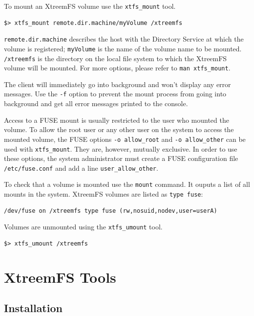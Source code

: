 \documentclass[a4paper,10pt]{book}
\begin{document}
To mount an XtreemFS volume use the \texttt{xtfs\_mount} tool.


\begin{verbatim}
$> xtfs_mount remote.dir.machine/myVolume /xtreemfs
\end{verbatim}


\texttt{remote.dir.machine} describes the host with the Directory Service at which the volume is registered; \texttt{myVolume} is the name of the volume name to be mounted. \texttt{/xtreemfs} is the directory on the local file system to which the XtreemFS volume will be mounted. For more options, please refer to \texttt{man xtfs\_mount}.

The client will immediately go into background and won't display any error messages. Use the \texttt{-f} option to prevent the mount process from going into background and get all error messages printed to the console.

Access to a FUSE mount is usually restricted to the user who mounted the volume. To allow the root user or any other user on the system to access the mounted volume, the FUSE options \texttt{-o allow\_root} and \texttt{-o allow\_other} can be used with \texttt{xtfs\_mount}. They are, however, mutually exclusive. In order to use these options, the system administrator must create a FUSE configuration file \texttt{/etc/fuse.conf} and add a line \texttt{user\_allow\_other}.

To check that a volume is mounted use the \texttt{mount} command. It ouputs a list of all mounts in the system. XtreemFS volumes are listed as \texttt{type fuse}:

\begin{verbatim}
/dev/fuse on /xtreemfs type fuse (rw,nosuid,nodev,user=userA)
\end{verbatim}

Volumes are unmounted using the \texttt{xtfs\_umount} tool.


\begin{verbatim}
$> xtfs_umount /xtreemfs
\end{verbatim}


\chapter{XtreemFS Tools}

\section{Installation}
\end{document}
